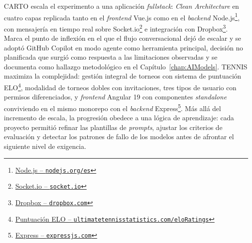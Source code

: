 \ac{CARTO} escala el experimento a una aplicación \textit{fullstack}: \textit{Clean Architecture} \cite{Martin:2018:CleanArchitecture} en cuatro capas replicada tanto en el \textit{frontend} Vue.js como en el \textit{backend} Node.js\footnote{\href{https://nodejs.org/es}{Node.js -- \texttt{nodejs.org/es}}}, con mensajería en tiempo real sobre Socket.io\footnote{\href{https://socket.io}{Socket.io -- \texttt{socket.io}}} e integración con Dropbox\footnote{\href{https://www.dropbox.com/}{Dropbox -- \texttt{dropbox.com}}}. Marca el punto de inflexión en el que el flujo conversacional dejó de escalar y se adoptó GitHub Copilot en modo agente como herramienta principal, decisión no planificada que surgió como respuesta a las limitaciones observadas y se documenta como hallazgo metodológico en el Capítulo~\ref{chap:AIModels}. \ac{TENNIS} maximiza la complejidad: gestión integral de torneos con sistema de puntuación ELO\footnote{\href{https://www.ultimatetennisstatistics.com/eloRatings}{Puntuación ELO -- \texttt{ultimatetennisstatistics.com/eloRatings}}}, modalidad de torneos dobles con invitaciones, tres tipos de usuario con permisos diferenciados, y \textit{frontend} Angular 19 con componentes \textit{standalone} conviviendo en el mismo monorepo con el \textit{backend} Express\footnote{\href{https://expressjs.com}{Express -- \texttt{expressjs.com}}}. Más allá del incremento de escala, la progresión obedece a una lógica de aprendizaje: cada proyecto permitió refinar las plantillas de \textit{prompts}, ajustar los criterios de evaluación y detectar los patrones de fallo de los modelos antes de afrontar el siguiente nivel de exigencia.

